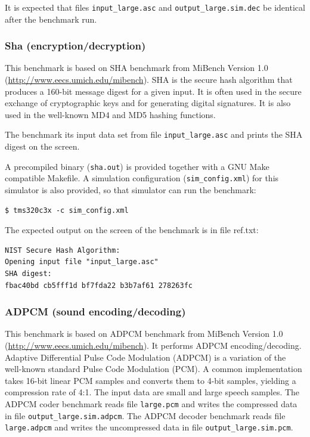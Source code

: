 It is expected that files \texttt{input\_large.asc} and \texttt{output\_large.sim.dec} be identical after the benchmark run.

\subsubsection{Sha (encryption/decryption)}

This benchmark is based on SHA benchmark from MiBench Version 1.0 (\url{http://www.eecs.umich.edu/mibench}).
SHA is the secure hash algorithm that produces a 160-bit message digest for a given input. It is often
used in the secure exchange of cryptographic keys and for generating digital signatures. It is also used in the
well-known MD4 and MD5 hashing functions.

The benchmark its input data set from file \texttt{input\_large.asc} and prints the SHA digest on the screen.

A precompiled binary (\texttt{sha.out}) is provided together with a GNU Make compatible Makefile.
A simulation configuration (\texttt{sim\_config.xml}) for this simulator is also provided, so that simulator can run the benchmark:

\begin{verbatim}
$ tms320c3x -c sim_config.xml
\end{verbatim}

The expected output on the screen of the benchmark is in file ref.txt:

\begin{verbatim}
NIST Secure Hash Algorithm:
Opening input file "input_large.asc"
SHA digest:
fbac40bd cb5fff1d bf7fda22 b3b7af61 278263fc
\end{verbatim}

\subsubsection{ADPCM (sound encoding/decoding)}

This benchmark is based on ADPCM benchmark from MiBench Version 1.0 (\url{http://www.eecs.umich.edu/mibench}).
It performs ADPCM encoding/decoding. Adaptive Differential Pulse Code Modulation (ADPCM) is a variation
of the well-known standard Pulse Code Modulation (PCM). A common implementation takes 16-bit linear
PCM samples and converts them to 4-bit samples, yielding a compression rate of 4:1. The input data are
small and large speech samples.
The ADPCM coder benchmark reads file \texttt{large.pcm} and writes the compressed data in file \texttt{output\_large.sim.adpcm}.
The ADPCM decoder benchmark reads file \texttt{large.adpcm} and writes the uncompressed data in file \texttt{output\_large.sim.pcm}.

